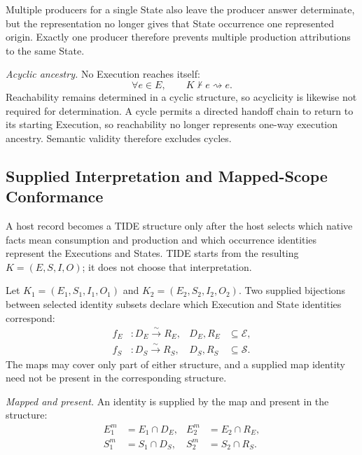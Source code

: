 \documentclass[conference]{IEEEtran}
\theoremstyle{tideproposition}
\newcommand{\reach}{\rightsquigarrow}
\begin{document}
Multiple producers for a single State also leave the producer answer determinate, but the representation no longer gives that State occurrence one represented origin. Exactly one producer therefore prevents multiple production attributions to the same State.

\emph{Acyclic ancestry.} No Execution reaches itself:
\begin{equation}
\forall e\in E,\qquad K\nvdash e\reach e.
\label{eq:acyclic-ancestry}
\end{equation}
Reachability remains determined in a cyclic structure, so acyclicity is likewise not required for determination. A cycle permits a directed handoff chain to return to its starting Execution, so reachability no longer represents one-way execution ancestry. Semantic validity therefore excludes cycles.

\subsection{Supplied Interpretation and Mapped-Scope Conformance}
A host record becomes a TIDE structure only after the host selects which native facts mean consumption and production and which occurrence identities represent the Executions and States. TIDE starts from the resulting $K=(E,S,I,O)$; it does not choose that interpretation.

Let $K_1=(E_1,S_1,I_1,O_1)$ and $K_2=(E_2,S_2,I_2,O_2)$. Two supplied bijections between selected identity subsets declare which Execution and State identities correspond:
\begin{equation}
\begin{aligned}
f_E&:D_E\overset{\sim}{\longrightarrow}R_E,
&D_E,R_E&\subseteq\mathcal{E},\\
f_S&:D_S\overset{\sim}{\longrightarrow}R_S,
&D_S,R_S&\subseteq\mathcal{S}.
\end{aligned}
\label{eq:supplied-identity-maps}
\end{equation}
The maps may cover only part of either structure, and a supplied map identity need not be present in the corresponding structure.

\emph{Mapped and present.} An identity is supplied by the map and present in the structure:
\begin{align}
E_1^m&=E_1\cap D_E, & E_2^m&=E_2\cap R_E,\\
S_1^m&=S_1\cap D_S, & S_2^m&=S_2\cap R_S.
\label{eq:mapped-present}
\end{align}
\end{document}
